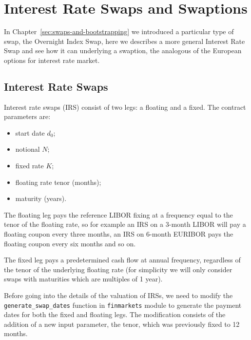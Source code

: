 \chapter{Interest Rate Swaps and Swaptions}
\label{interest-rate-swaps-and-swaptions}

In Chapter~\ref{sec:swaps-and-bootstrapping} we introduced a particular type of swap, the Overnight Index Swap, here we describes a more general Interest Rate Swap and see how it can underlying a swaption, the analogous of the European options for interest rate market.

\section{Interest Rate Swaps}\label{interest-rate-swaps}

Interest rate swaps (IRS) consist of two legs: a floating and a fixed. The
contract parameters are:

\begin{itemize}
\tightlist
\item
  start date \(d_0\);
\item
  notional \(N\);
\item
  fixed rate \(K\);
\item
  floating rate tenor (months);
\item
  maturity (years).
\end{itemize}

The floating leg pays the reference LIBOR fixing at a frequency equal to
the tenor of the floating rate, so for example an IRS on a 3-month
LIBOR will pay a floating coupon every three months, an IRS on 6-month
EURIBOR pays the floating coupon every six months and so on.

The fixed leg pays a predetermined cash flow at annual frequency,
regardless of the tenor of the underlying floating rate (for simplicity we will only consider swaps with maturities which are multiples of 1 year).

Before going into the details of the valuation of IRSs, we need to
modify the \texttt{generate\_swap\_dates} function in
\texttt{finmarkets} module to generate the payment dates for both the
fixed and floating legs. 
The modification consists of the addition of a new input
parameter, the tenor, which was previously fixed to 12 months.

